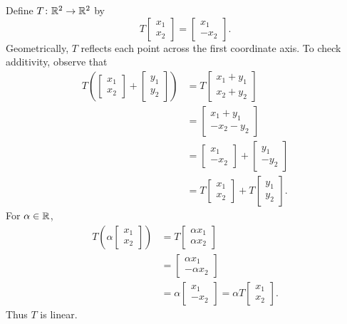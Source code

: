 \begin{example}[Reflection]
  Define $T\colon\mathbb{R}^2\to\mathbb{R}^2$ by
  \[
    T\begin{bmatrix}x_1\\x_2\end{bmatrix}
    =\begin{bmatrix}x_1\\-x_2\end{bmatrix}.
  \]
  Geometrically, $T$ reflects each point across the first coordinate
  axis. To check additivity, observe that
  \begin{align*}
    T\left(
      \begin{bmatrix}x_1\\x_2\end{bmatrix}
      +\begin{bmatrix}y_1\\y_2\end{bmatrix}
    \right)
    &=T\begin{bmatrix}x_1+y_1\\x_2+y_2\end{bmatrix} \\
    &=\begin{bmatrix}x_1+y_1\\-x_2-y_2\end{bmatrix} \\
    &=\begin{bmatrix}x_1\\-x_2\end{bmatrix}
      +\begin{bmatrix}y_1\\-y_2\end{bmatrix} \\
    &=T\begin{bmatrix}x_1\\x_2\end{bmatrix}
      +T\begin{bmatrix}y_1\\y_2\end{bmatrix}.
  \end{align*}
  For $\alpha\in\mathbb{R}$,
  \begin{align*}
    T\left(\alpha\begin{bmatrix}x_1\\x_2\end{bmatrix}\right)
    &=T\begin{bmatrix}\alpha x_1\\\alpha x_2\end{bmatrix} \\
    &=\begin{bmatrix}\alpha x_1\\-\alpha x_2\end{bmatrix} \\
    &=\alpha\begin{bmatrix}x_1\\-x_2\end{bmatrix}
      =\alpha T\begin{bmatrix}x_1\\x_2\end{bmatrix}.
  \end{align*}
  Thus $T$ is linear.
\end{example}

